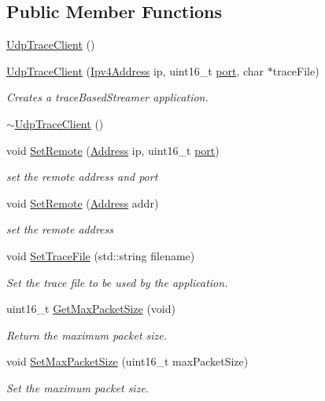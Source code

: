 \subsection*{Public Member Functions}
\begin{DoxyCompactItemize}
\item 
\hyperlink{structns3_1_1UdpTraceClient_a5d09887e8f1b9de87667547e7317b0f3}{Udp\+Trace\+Client} ()
\item 
\hyperlink{structns3_1_1UdpTraceClient_a84242659bd33470aebf8f395c7413382}{Udp\+Trace\+Client} (\hyperlink{classns3_1_1Ipv4Address}{Ipv4\+Address} ip, uint16\+\_\+t \hyperlink{visualizer-ideas_8txt_a21ff1c530daf8435e00048b7fc2c58e3}{port}, char $\ast$trace\+File)
\begin{DoxyCompactList}\small\item\em Creates a trace\+Based\+Streamer application. \end{DoxyCompactList}\item 
\hyperlink{structns3_1_1UdpTraceClient_a3b08e495718ba9d1b4e263e6f3fec013}{$\sim$\+Udp\+Trace\+Client} ()
\item 
void \hyperlink{structns3_1_1UdpTraceClient_a22edc0eceea76a4531b37492a5678f11}{Set\+Remote} (\hyperlink{classns3_1_1Address}{Address} ip, uint16\+\_\+t \hyperlink{visualizer-ideas_8txt_a21ff1c530daf8435e00048b7fc2c58e3}{port})
\begin{DoxyCompactList}\small\item\em set the remote address and port \end{DoxyCompactList}\item 
void \hyperlink{structns3_1_1UdpTraceClient_a683349526867cba3290287f4c4912b50}{Set\+Remote} (\hyperlink{classns3_1_1Address}{Address} addr)
\begin{DoxyCompactList}\small\item\em set the remote address \end{DoxyCompactList}\item 
void \hyperlink{structns3_1_1UdpTraceClient_a3439722a8941b9c1ab3fd564dcdafeb0}{Set\+Trace\+File} (std\+::string filename)
\begin{DoxyCompactList}\small\item\em Set the trace file to be used by the application. \end{DoxyCompactList}\item 
uint16\+\_\+t \hyperlink{structns3_1_1UdpTraceClient_a99e588c37d82b74aee49b0d78c0af2cd}{Get\+Max\+Packet\+Size} (void)
\begin{DoxyCompactList}\small\item\em Return the maximum packet size. \end{DoxyCompactList}\item 
void \hyperlink{structns3_1_1UdpTraceClient_a3c8a2e0618d12932e5bdf71f9f3f2648}{Set\+Max\+Packet\+Size} (uint16\+\_\+t max\+Packet\+Size)
\begin{DoxyCompactList}\small\item\em Set the maximum packet size. \end{DoxyCompactList}\end{DoxyCompactItemize}
